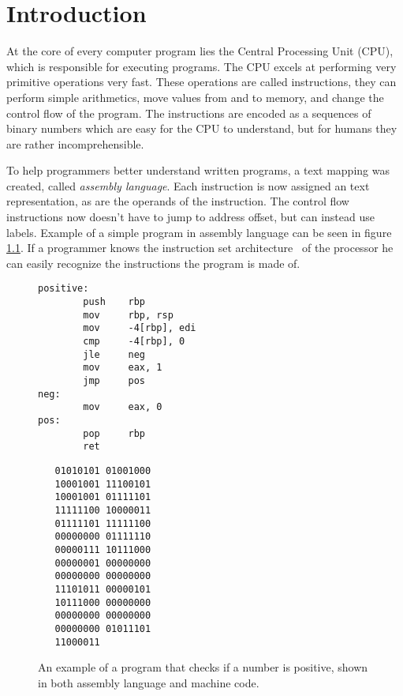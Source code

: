 \chapter{Introduction}
At the core of every computer program lies the Central Processing Unit (CPU),
which is responsible for executing programs. The CPU excels at performing very
primitive operations very fast. These operations are called instructions, they
can perform simple arithmetics, move values from and to memory, and change the
control flow of the program. The instructions are encoded as a sequences of
binary numbers which are easy for the CPU to understand, but for humans they
are rather incomprehensible.

To help programmers better understand written programs, a text mapping was
created, called \textit{assembly language}. Each instruction is now assigned an
text representation, as are the operands of the instruction. The control flow
instructions now doesn't have to jump to address offset, but can instead use
labels. Example of a simple program in assembly language can be seen in figure
\ref{fig:simple-assembly}. If a programmer knows the instruction set
architecture~\cite{aps-isa} of the processor he can easily recognize the
instructions the program is made of.

\begin{figure}
    \begin{minipage}{.45\textwidth}
    \begin{lstlisting}
positive:
        push    rbp
        mov     rbp, rsp
        mov     -4[rbp], edi
        cmp     -4[rbp], 0
        jle     neg
        mov     eax, 1
        jmp     pos
neg:
        mov     eax, 0
pos:
        pop     rbp
        ret
    \end{lstlisting}
    \end{minipage}
    \hfill\vline\hfill
    \begin{minipage}{.45\textwidth}
    \begin{lstlisting}
   01010101 01001000
   10001001 11100101
   10001001 01111101
   11111100 10000011
   01111101 11111100
   00000000 01111110
   00000111 10111000
   00000001 00000000
   00000000 00000000
   11101011 00000101
   10111000 00000000
   00000000 00000000
   00000000 01011101
   11000011
    \end{lstlisting}
    \end{minipage}
    \caption{An example of a program that checks if a number is positive, shown
    in both assembly language and machine code.}
    \label{fig:simple-assembly}
\end{figure}

